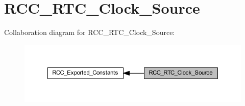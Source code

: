 \hypertarget{group___r_c_c___r_t_c___clock___source}{}\section{R\+C\+C\+\_\+\+R\+T\+C\+\_\+\+Clock\+\_\+\+Source}
\label{group___r_c_c___r_t_c___clock___source}
Collaboration diagram for R\+C\+C\+\_\+\+R\+T\+C\+\_\+\+Clock\+\_\+\+Source\+:\nopagebreak
\begin{figure}[H]
\begin{center}
\leavevmode
\includegraphics[width=350pt]{group___r_c_c___r_t_c___clock___source}
\end{center}
\end{figure}

